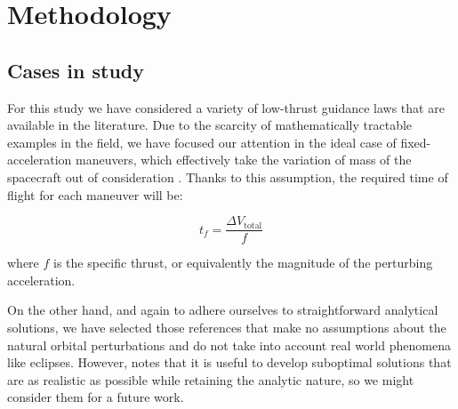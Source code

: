 \chapter{Methodology} \label{methodology}

\section{Cases in study} \label{cases}

For this study we have considered a variety of low-thrust guidance laws that are available in the literature. Due to the scarcity of mathematically tractable examples in the field, we have focused our attention in the ideal case of fixed-acceleration maneuvers, which effectively take the variation of mass of the spacecraft out of consideration \cite{battin1999introduction}. Thanks to this assumption, the required time of flight for each maneuver will be:
% 
% 
%
%

\[
t_f = \frac{\Delta V_{\text{total}}}{f}
\]

where $f$ is the specific thrust, or equivalently the magnitude of the perturbing acceleration.
% 
% 

On the other hand, and again to adhere ourselves to straightforward analytical solutions, we have selected those references that make no assumptions about the natural orbital perturbations and do not take into account real world phenomena like eclipses. However, \cite{kechichian1997reformulation} notes that it is useful to develop suboptimal solutions that are as realistic as possible while retaining the analytic nature, so we might consider them for a future work.


